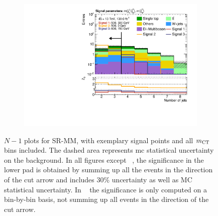 \begin{figure}
\begin{subfigure}[b]{0.4\linewidth}
		\centering\includegraphics[width=\textwidth]{n1_SRMM_mct_bins/nJet30.pdf}
		\caption{\label{fig:Wh_reopt_second_round_n1_srmm_njet}}
	\end{subfigure}
	\caption{$N-1$ plots for SR-MM, with exemplary signal points and all $m_{\textrm{CT}}$ bins included. The dashed area represents \gls{mc} statistical uncertainty on the background. In all figures except \figname~, the significance in the lower pad is obtained by summing up all the events in the direction of the cut arrow and includes 30\% uncertainty as well as MC statistical uncertainty. In \figname~ the significance is only computed on a bin-by-bin basis, \ie not summing up all events in the direction of the cut arrow.}
	\label{fig:Wh_reopt_second_round_n1_srmm}
\end{figure}

